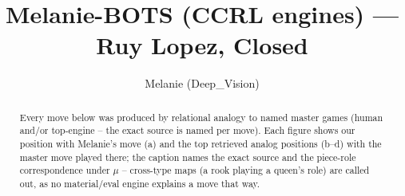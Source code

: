 \documentclass[11pt]{article}
\title{Melanie-BOTS (CCRL engines) — Ruy Lopez, Closed}
\author{Melanie (Deep\_Vision)}
\date{}
\begin{document}
\maketitle

\begin{abstract}Every move below was produced by relational analogy to named master games (human and/or top-engine -- the exact source is named per move). Each figure shows our position with Melanie's move (a) and the top retrieved analog positions (b--d) with the master move played there; the caption names the exact source and the piece-role correspondence under $\mu$ -- cross-type maps (a rook playing a queen's role) are called out, as no material/eval engine explains a move that way.\end{abstract}

\begin{figure}[p]\centering
\begin{subfigure}{0.46\textwidth}\centering
\resizebox{\linewidth}{!}{%
\newchessgame
\chessboard[
  setfen={r1bqk2r/2p1bppp/p1np1n2/1p2p3/4P3/1B3N2/PPPP1PPP/RNBQR1K1 w kq - 0 8},
  showmover=false,
  pgfstyle=straightmove, color=movearrow, markmove={b1-c3}
]}
\caption{}
\end{subfigure}\hfill
\begin{subfigure}{0.46\textwidth}\centering
\resizebox{\linewidth}{!}{%
\newchessgame
\chessboard[
  setfen={r1bqk2r/2p1bppp/p1np1n2/1p2p3/4P3/1B3N2/PPPP1PPP/RNBQR1K1 w kq - 0 8},
  showmover=false,
  pgfstyle=straightmove, color=movearrow, markmove={c2-c3}
]}
\caption{}
\end{subfigure}
\\[4pt]
\begin{subfigure}{0.46\textwidth}\centering
\resizebox{\linewidth}{!}{%
\newchessgame
\chessboard[
  setfen={r1bqk2r/2p1bppp/p1np1n2/1p2p3/4P3/1B3N2/PPPP1PPP/RNBQR1K1 w kq - 0 8},
  showmover=false,
  pgfstyle=straightmove, color=movearrow, markmove={c2-c3}
]}
\caption{}
\end{subfigure}\hfill
\begin{subfigure}{0.46\textwidth}\centering
\resizebox{\linewidth}{!}{%
\newchessgame
\chessboard[
  setfen={r1bqk2r/2p1bppp/p1np1n2/1p2p3/4P3/1B3N2/PPPP1PPP/RNBQR1K1 w kq - 2 8},
  showmover=false,
  pgfstyle=straightmove, color=movearrow, markmove={c2-c3}
]}
\caption{}
\end{subfigure}

\end{figure}
\end{document}
